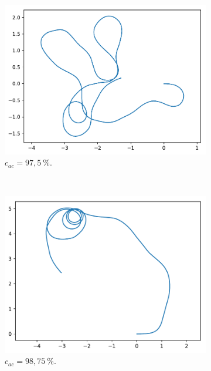 \begin{appendices}
	\begin{figure}[htb]
		\centering
		\begin{subfigure}[t]{\subImgWarea}
			\centering
			\includegraphics[width=\textwidth]{figures/ch3/2_19_autocorr_2_19_180_32_0_975}
			\caption{$c_{ac} = 97,5~\%$.}
			\label{fig:2_19_autocorr_2_19_180_32_0_975}
		\end{subfigure}
		~
		\begin{subfigure}[t]{\subImgWarea}
			\centering
			\includegraphics[width=\textwidth]{figures/ch3/2_19_autocorr_2_19_180_32_0_9875}
			\caption{$c_{ac} = 98,75~\%$.}
			\label{fig:2_19_autocorr_2_19_180_32_0_9875}
		\end{subfigure}
		~
		\begin{subfigure}[t]{\subImgWarea}

\end{subfigure}
\end{figure}
\end{appendices}

